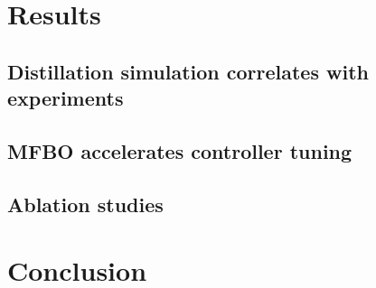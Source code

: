 

\section{Results}

\subsection{Distillation simulation correlates with experiments}



\subsection{MFBO accelerates controller tuning}





\subsection{Ablation studies}




\section{Conclusion}